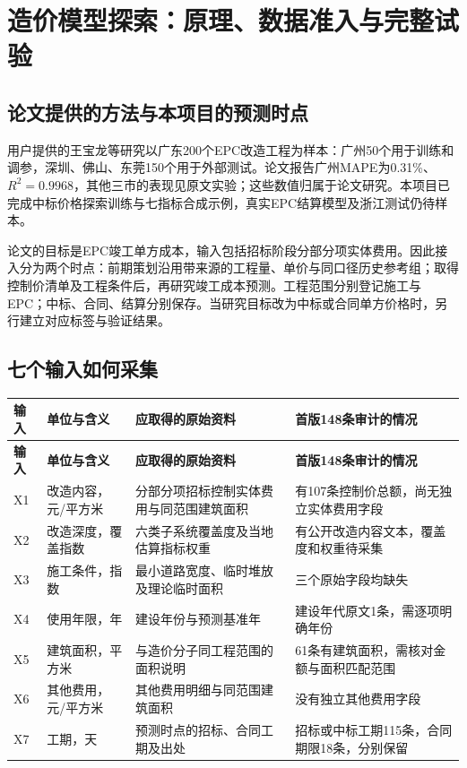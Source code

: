 \section{造价模型探索：原理、数据准入与完整试验}\label{app:cost-neural}

\subsection{论文提供的方法与本项目的预测时点}

用户提供的王宝龙等研究以广东200个EPC改造工程为样本：广州50个用于训练和调参，深圳、佛山、东莞150个用于外部测试。论文报告广州MAPE为0.31\%、$R^2=0.9968$，其他三市的表现见原文实验；这些数值归属于论文研究。本项目已完成中标价格探索训练与七指标合成示例，真实EPC结算模型及浙江测试仍待样本。\cite{psobp2026}

论文的目标是EPC竣工单方成本，输入包括招标阶段分部分项实体费用。因此接入分为两个时点：前期策划沿用带来源的工程量、单价与同口径历史参考组；取得控制价清单及工程条件后，再研究竣工成本预测。工程范围分别登记施工与EPC；中标、合同、结算分别保存。当研究目标改为中标或合同单方价格时，另行建立对应标签与验证结果。

\subsection{七个输入如何采集}

\begin{longtable}{@{}L{12mm}L{29mm}L{58mm}L{55mm}@{}}
\toprule\textbf{输入}&\textbf{单位与含义}&\textbf{应取得的原始资料}&\textbf{首版148条审计的情况}\\
\midrule\endfirsthead
\toprule\textbf{输入}&\textbf{单位与含义}&\textbf{应取得的原始资料}&\textbf{首版148条审计的情况}\\
\midrule\endhead
X1&改造内容，元/平方米&分部分项招标控制实体费用与同范围建筑面积&有107条控制价总额，尚无独立实体费用字段\\
X2&改造深度，覆盖指数&六类子系统覆盖度及当地估算指标权重&有公开改造内容文本，覆盖度和权重待采集\\
X3&施工条件，指数&最小道路宽度、临时堆放及理论临时面积&三个原始字段均缺失\\
X4&使用年限，年&建设年份与预测基准年&建设年代原文1条，需逐项明确年份\\
X5&建筑面积，平方米&与造价分子同工程范围的面积说明&61条有建筑面积，需核对金额与面积匹配范围\\
X6&其他费用，元/平方米&其他费用明细与同范围建筑面积&没有独立其他费用字段\\
X7&工期，天&预测时点的招标、合同工期及出处&招标或中标工期115条，合同期限18条，分别保留\\
\bottomrule\end{longtable}

